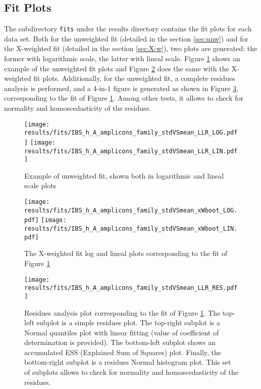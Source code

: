 \documentclass[12pt]{article}
\begin{document}
\subsection{Fit Plots}
The subdirectory \texttt{fits} under the results directory contains the fit plots for each data set. Both for the unweighted fit (detailed in the section \ref{sec:unw}) and for the X-weighted fit (detailed in the section \ref{sec:X-w}), two plots are generated: the former with logarithmic scale, the latter with lineal scale. Figure \ref{fig:unwFit} shows an example of the unweighted fit plots and Figure \ref{fig:X-wFit} does the same with the X-weighted fit plots. Additionally, for the unweighted fit, a complete residues analysis is performed, and a 4-in-1 figure is generated as shown in Figure \ref{fig:unwRes}, corresponding to the fit of Figure \ref{fig:unwFit}. Among other tests, it allows to check for normality and homoscedasticity of the residues.

\begin{figure}
	\centering
	\texttt{[image: results/fits/IBS\_h\_A\_amplicons\_family\_stdVSmean\_LLR\_LOG.pdf]}
	\texttt{[image: results/fits/IBS\_h\_A\_amplicons\_family\_stdVSmean\_LLR\_LIN.pdf]}
	\caption{Example of unweighted fit, shown both in logarithmic and lineal scale plots}
	\label{fig:unwFit}
\end{figure}

\begin{figure}
	\centering
	\texttt{[image: results/fits/IBS\_h\_A\_amplicons\_family\_stdVSmean\_xWboot\_LOG.pdf]}
	\texttt{[image: results/fits/IBS\_h\_A\_amplicons\_family\_stdVSmean\_xWboot\_LIN.pdf]}
	\caption{The X-weighted fit log and lineal plots corresponding to the fit of Figure \ref{fig:unwFit}}
	\label{fig:X-wFit}
\end{figure}

\begin{figure}
	\centering
	\texttt{[image: results/fits/IBS\_h\_A\_amplicons\_family\_stdVSmean\_LLR\_RES.pdf]}
	\caption{Residues analysis plot corresponding to the fit of Figure \ref{fig:unwFit}. The top-left subplot is a simple residues plot. The top-right subplot is a Normal quantiles plot with linear fitting (value of coefficient of determination is provided). The bottom-left subplot shows an accumulated ESS (Explained Sum of Squares) plot. Finally, the bottom-right subplot is a residues Normal histogram plot. This set of subplots allows to check for normality and homoscedasticity of the residues.}
	\label{fig:unwRes}
\end{figure}
\end{document}
